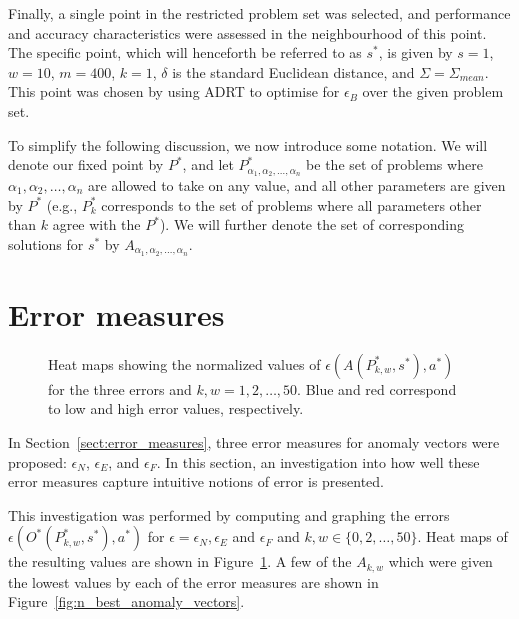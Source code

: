 Finally, a single point in the restricted problem set was selected, and performance and accuracy characteristics were assessed in the neighbourhood of this point. The specific point, which will henceforth be referred to as $s^*$, is given by $s = 1$, $w = 10$, $m = 400$, $k = 1$, $\delta$ is the standard Euclidean distance, and $\Sigma = \Sigma_{mean}$. This point was chosen by using ADRT to optimise for $\epsilon_B$ over the given problem set.

To simplify the following discussion, we now introduce some notation. We will denote our fixed point by $P^*$, and let $P^*_{\alpha_1, \alpha_2, \dots, \alpha_n}$ be the set of problems where $\alpha_1, \alpha_2, \dots, \alpha_n$ are allowed to take on any value, and all other parameters are given by $P^*$ (e.g., $P^*_k$ corresponds to the set of problems where all parameters other than $k$ agree with the $P^*$). We will further denote the set of corresponding solutions for $s^*$ by $A_{\alpha_1, \alpha_2, \dots, \alpha_n}$.

\section{Error measures}
\label{sect:error_measure_eval}

\begin{figure}
    \centering
    \caption{Heat maps showing the normalized values of $\epsilon(A(P_{k, w}^*, s^*), a^*)$ for the three errors and $k, w = 1,2,\dots,50$. Blue and red correspond to low and high error values, respectively.}
\label{fig:error_heat_maps}
\end{figure}

In Section~\ref{sect:error_measures}, three error measures for anomaly vectors were proposed: $\epsilon_N$, $\epsilon_E$, and $\epsilon_F$. In this section, an investigation into how well these error measures capture intuitive notions of error is presented.

This investigation was performed by computing and graphing the errors \\ $\epsilon(O^*(P_{k, w}^*, s^*), a^*)$ for $\epsilon = \epsilon_N, \epsilon_E$ and $\epsilon_F$ and $k, w \in \{0,2,\dots,50\}$. Heat maps of the resulting values are shown in Figure~\ref{fig:error_heat_maps}. A few of the $A_{k, w}$ which were given the lowest values by each of the error measures are shown in Figure~\ref{fig:n_best_anomaly_vectors}.

